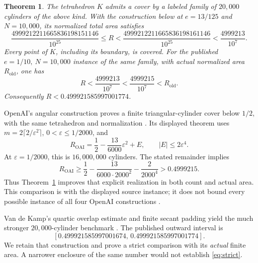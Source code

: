 \documentclass[11pt]{article}
\newtheorem{theorem}{Theorem}
\begin{document}
\begin{theorem}\label{thm:main}
The tetrahedron \(K\) admits a cover by a labeled family of \(20{,}000\)
cylinders of the above kind. With the construction below at
\(e=13/125\) and \(N=10{,}000\), its normalized total area satisfies
\begin{equation}\label{eq:newinterval}
 \frac{4999212211665836198151146}{10^{25}}
 \le R <
 \frac{4999212211665836198161146}{10^{25}}
 <\frac{4999213}{10^7}.
\end{equation}
Every point of \(K\), including its boundary, is covered.
For the published \(e=1/10,\ N=10{,}000\) instance of the same family,
with actual normalized area \(R_{\mathrm{old}}\), one has
\begin{equation}\label{eq:strict}
 R<\frac{4999213}{10^7}<\frac{4999215}{10^7}<R_{\mathrm{old}}.
\end{equation}
Consequently \(R<0.499921585997001774\).
\end{theorem}

OpenAI's angular construction proves a finite triangular-cylinder
cover below \(1/2\), with the same tetrahedron and normalization
\cite{openai-angular}. Its displayed theorem uses
\(m=2\lceil2/\varepsilon^2\rceil\), \(0<\varepsilon\le1/2000\), and
\[
 R_{\mathrm{OAI}}=\frac12-\frac{13}{6000}\varepsilon^2+E,\qquad
 |E|\le2\varepsilon^4.
\]
At \(\varepsilon=1/2000\), this is \(16{,}000{,}000\) cylinders.
The stated remainder implies
\[
 R_{\mathrm{OAI}}\ge
 \frac12-\frac{13}{6000\cdot2000^2}-\frac{2}{2000^4}>0.4999215.
\]
Thus Theorem~\ref{thm:main} improves that explicit realization in both
count and actual area. This comparison is with the displayed source
instance; it does not bound every possible instance of all four
OpenAI constructions \cite{openai-angular,openai-ruled,openai-slope,openai-radial}.

Van de Kamp's quartic overlap estimate and finite secant padding yield
the much stronger \(20{,}000\)-cylinder benchmark
\cite{vdk-secant,vdk-result}. The published outward interval is
\[
 [0.499921585997001674,\,0.499921585997001774].
\]
We retain that construction and prove a strict comparison with its
\emph{actual} finite area. A narrower enclosure of the same number would
not establish \eqref{eq:strict}.
\end{document}
